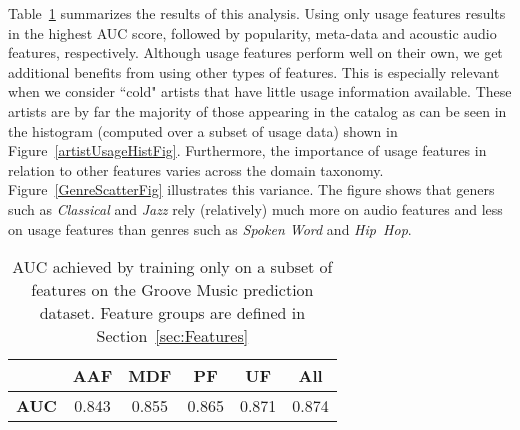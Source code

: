 Table~\ref{tab:features_AUC} summarizes the  results of this analysis. Using only usage features results in the highest AUC score, followed by popularity, meta-data and acoustic audio features, respectively. Although usage features perform well on their own, we get additional benefits from using other types of features. This is especially relevant when we consider ``cold" artists that have little usage information available. These artists are by far the majority of those appearing in the catalog as can be seen in the histogram (computed over a subset of usage data) shown in Figure~\ref{artistUsageHistFig}.  Furthermore, the importance of usage features in relation to other features varies across the domain taxonomy. Figure~\ref{GenreScatterFig} illustrates this variance. The figure shows that geners such as \textit{Classical} and \textit{Jazz} rely (relatively) much more on audio features and less on usage features than genres such as \textit{Spoken Word} and \textit{Hip~Hop}.


\begin{table}[h!]
\begin{center}
	\begin{tabular}{|c|c|c|c|c|c|}
		\hline
		 & {\bf AAF} & {\bf MDF} & {\bf PF} & {\bf UF} & {\bf All}\\ 
		\hline
		 {\bf AUC} & 0.843  & 0.855 & 0.865 & 0.871 & 0.874\\ 
		\hline
	\end{tabular}
	\vspace{-0.4cm}
\end{center}
\caption{AUC achieved by training only on a subset of features on the Groove Music prediction dataset. Feature groups are defined in Section~\ref{sec:Features}}
\label{tab:features_AUC}
\end{table}











